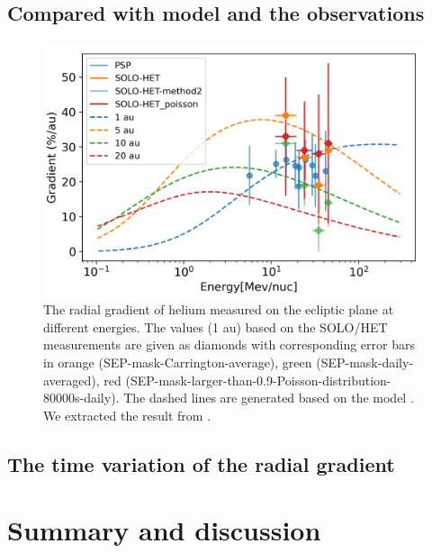 \subsection*{Compared with model and the observations}
\begin{figure}[!htb]
    \centering
    \includegraphics{images/ACR/Gradient_Energy_distribution_v2}
    \caption{The radial gradient of helium measured on the ecliptic plane at different energies. The values (1 au) based on the SOLO/HET measurements are given as diamonds with corresponding error bars in orange (SEP-mask-Carrington-average), green (SEP-mask-daily-averaged), red (SEP-mask-larger-than-0.9-Poisson-distribution-80000s-daily). The dashed lines are generated based on the model \citep{Strauss2010JGRA}. We extracted the result from \citep{Rankin2021ApJ}.  }
    \label{fig:comparison_SOLO_PSP}
\end{figure}


\subsection*{The time variation of the radial gradient}


\section{ Summary and discussion}

